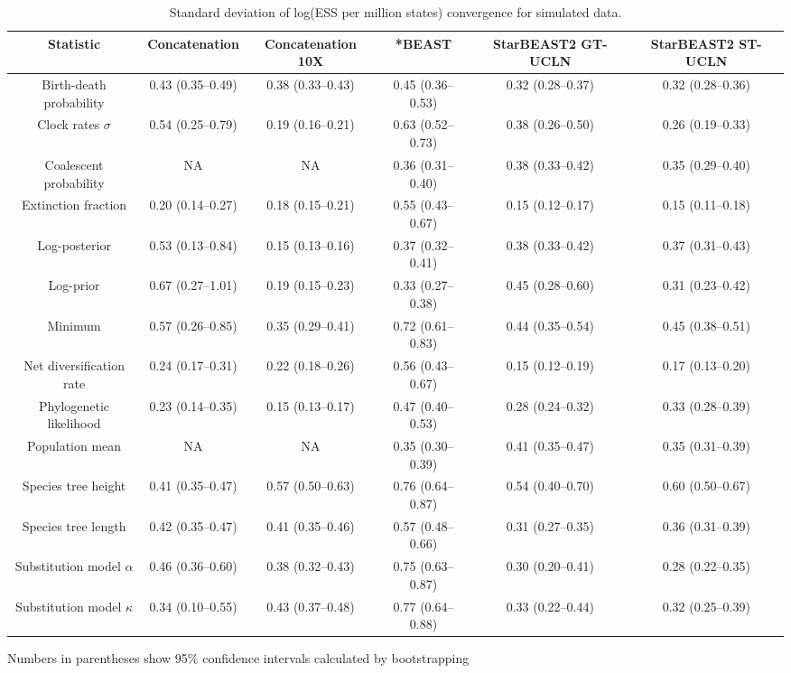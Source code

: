 \documentclass[12pt]{article}
\begin{document}
\begin{landscape}
\clearpage

\begin{table}[htb!]
\centering
\caption{Standard deviation of log(ESS per million states) convergence for simulated data.}
\label{tab:simulatedPerMstatesSD}
\begin{threeparttable}
\begin{adjustbox}{center}
\renewcommand{\arraystretch}{1.2}
\footnotesize
\begin{tabular}{|c|c|c|c|c|c|}
\multicolumn{1}{c}{Statistic} & \multicolumn{1}{c}{Concatenation} & \multicolumn{1}{c}{Concatenation 10X} & \multicolumn{1}{c}{*BEAST} & \multicolumn{1}{c}{StarBEAST2 GT-UCLN} & \multicolumn{1}{c}{StarBEAST2 ST-UCLN}\tabularnewline
\hline
Birth-death probability & 0.43 (0.35--0.49) & 0.38 (0.33--0.43) & 0.45 (0.36--0.53) & 0.32 (0.28--0.37) & 0.32 (0.28--0.36)\tabularnewline
\hline
Clock rates $\sigma$ & 0.54 (0.25--0.79) & 0.19 (0.16--0.21) & 0.63 (0.52--0.73) & 0.38 (0.26--0.50) & 0.26 (0.19--0.33)\tabularnewline
\hline
Coalescent probability & NA & NA & 0.36 (0.31--0.40) & 0.38 (0.33--0.42) & 0.35 (0.29--0.40)\tabularnewline
\hline
Extinction fraction & 0.20 (0.14--0.27) & 0.18 (0.15--0.21) & 0.55 (0.43--0.67) & 0.15 (0.12--0.17) & 0.15 (0.11--0.18)\tabularnewline
\hline
Log-posterior & 0.53 (0.13--0.84) & 0.15 (0.13--0.16) & 0.37 (0.32--0.41) & 0.38 (0.33--0.42) & 0.37 (0.31--0.43)\tabularnewline
\hline
Log-prior & 0.67 (0.27--1.01) & 0.19 (0.15--0.23) & 0.33 (0.27--0.38) & 0.45 (0.28--0.60) & 0.31 (0.23--0.42)\tabularnewline
\hline
Minimum & 0.57 (0.26--0.85) & 0.35 (0.29--0.41) & 0.72 (0.61--0.83) & 0.44 (0.35--0.54) & 0.45 (0.38--0.51)\tabularnewline
\hline
Net diversification rate & 0.24 (0.17--0.31) & 0.22 (0.18--0.26) & 0.56 (0.43--0.67) & 0.15 (0.12--0.19) & 0.17 (0.13--0.20)\tabularnewline
\hline
Phylogenetic likelihood & 0.23 (0.14--0.35) & 0.15 (0.13--0.17) & 0.47 (0.40--0.53) & 0.28 (0.24--0.32) & 0.33 (0.28--0.39)\tabularnewline
\hline
Population mean & NA & NA & 0.35 (0.30--0.39) & 0.41 (0.35--0.47) & 0.35 (0.31--0.39)\tabularnewline
\hline
Species tree height & 0.41 (0.35--0.47) & 0.57 (0.50--0.63) & 0.76 (0.64--0.87) & 0.54 (0.40--0.70) & 0.60 (0.50--0.67)\tabularnewline
\hline
Species tree length & 0.42 (0.35--0.47) & 0.41 (0.35--0.46) & 0.57 (0.48--0.66) & 0.31 (0.27--0.35) & 0.36 (0.31--0.39)\tabularnewline
\hline
Substitution model $\alpha$ & 0.46 (0.36--0.60) & 0.38 (0.32--0.43) & 0.75 (0.63--0.87) & 0.30 (0.20--0.41) & 0.28 (0.22--0.35)\tabularnewline
\hline
Substitution model $\kappa$ & 0.34 (0.10--0.55) & 0.43 (0.37--0.48) & 0.77 (0.64--0.88) & 0.33 (0.22--0.44) & 0.32 (0.25--0.39)\tabularnewline
\hline
\end{tabular}
\end{adjustbox}
\begin{tablenotes}
\footnotesize
\item Numbers in parentheses show 95\% confidence intervals calculated by bootstrapping
\end{tablenotes}
\end{threeparttable}
\end{table}

\end{landscape}
\end{document}
